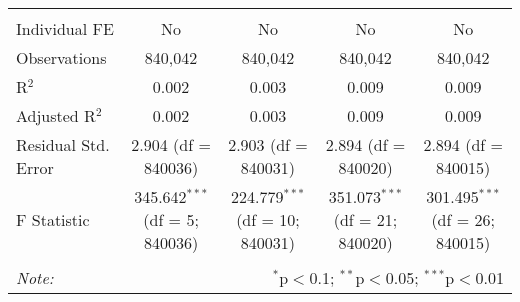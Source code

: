 \documentclass[
]{article}
\begin{document}
\begin{table}[!htbp]
{\begin{tabular}{@{\extracolsep{5pt}}lcccc}
  & & & & \\ 
\hline \\[-1.8ex] 
Individual FE & No & No & No & No \\ 
Observations & 840,042 & 840,042 & 840,042 & 840,042 \\ 
R$^{2}$ & 0.002 & 0.003 & 0.009 & 0.009 \\ 
Adjusted R$^{2}$ & 0.002 & 0.003 & 0.009 & 0.009 \\ 
Residual Std. Error & 2.904 (df = 840036) & 2.903 (df = 840031) & 2.894 (df = 840020) & 2.894 (df = 840015) \\ 
F Statistic & 345.642$^{***}$ (df = 5; 840036) & 224.779$^{***}$ (df = 10; 840031) & 351.073$^{***}$ (df = 21; 840020) & 301.495$^{***}$ (df = 26; 840015) \\ 
\hline 
\hline \\[-1.8ex] 
\textit{Note:}  & \multicolumn{4}{r}{$^{*}$p$<$0.1; $^{**}$p$<$0.05; $^{***}$p$<$0.01} \\ 
\end{tabular}
} 
\end{table} 
\newpage
\end{document}
